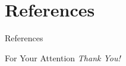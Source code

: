 \documentclass{beamer}
\begin{document}
\section{References}
\begin{frame}[allowframebreaks]{References}
	
	\nocite{*}
    \printbibliography

\end{frame}

\begin{frame}{For Your Attention}
    \centering
    \Large
    \emph{Thank You!}
\end{frame}
\end{document}
